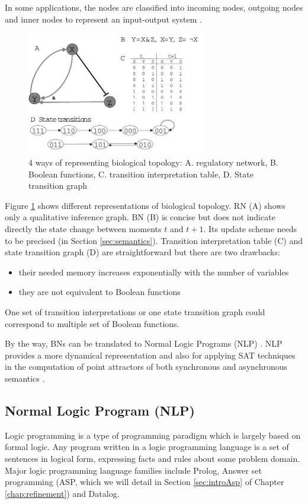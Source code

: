 In some applications, the nodes are classified into incoming nodes, outgoing nodes and inner nodes to represent an input-output system \cite{akutsu2007control}.

\begin{figure}[ht]
    \centering
    \includegraphics[width=0.7\textwidth]{BooleanNetwork.png}
    \caption[Representations of Biological Topology]{4 ways of representing biological topology: A. regulatory network, B. Boolean functions, C. transition interpretation table, D. State transition graph}
    \label{fig:booleannetwork}
\end{figure}

Figure \ref{fig:booleannetwork} shows different representations of biological topology.
RN (A) shows only a qualitative inference graph.
BN (B) is concise but does not indicate directly the state change between moments $t$ and $t+1$.
Its update scheme needs to be precised (in Section \ref{sec:semantics}).
Transition interpretation table (C) and state transition graph (D) are straightforward but there are two drawbacks: 
\begin{itemize}
    \item their needed memory increases exponentially with the number of variables
    \item they are not equivalent to Boolean functions
\end{itemize}
One set of transition interpretations or one state transition graph could correspond to multiple set of Boolean functions.

By the way, BNs can be translated to Normal Logic Programs (NLP) \cite{inoue2011logic}.
NLP provides a more dynamical representation and also for applying SAT techniques in the computation of point attractors of both synchronous and asynchronous semantics \cite{dubrova2011sat,harvey1997time}.

\subsection{Normal Logic Program (NLP)}\label{sec:logicProgram}
Logic programming is a type of programming paradigm which is largely based on formal logic.
Any program written in a logic programming language is a set of sentences in logical form, expressing facts and rules about some problem domain.
Major logic programming language families include Prolog, Answer set programming (ASP, which we will detail in Section \ref{sec:introAsp} of Chapter \ref{chap:refinement}) and Datalog.

